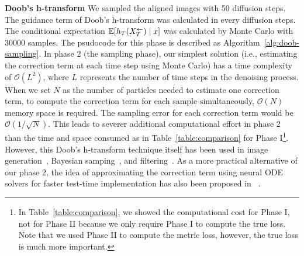 \textbf{Doob's h-transform}
We sampled the aligned images with 50 diffusion steps. The guidance term of Doob's h-transform was calculated in every diffusion steps. The conditional expectation $\mathbb{E}[h_T(X^\leftarrow_T) \mid x]$ was calculated by Monte Carlo with 30000 samples. The psudocode for this phase is described as Algorithm~\ref{alg:doob-sampling}.
\revisedStart
In phase 2 (the sampling phase), our simplest solution (i.e., estimating the correction term at each time step using Monte Carlo) has a time complexity of $\mathcal{O}(L^2)$, where $L$ represents the number of time steps in the denoising process. When we set $N$ as the number of particles needed to estimate one correction term, to compute the correction term for each sample simultaneously, $ \mathcal{O}(N)$ memory space is required. The sampling error for each correction term would be $\mathcal{O}(1/\sqrt{N})$. This leads to severer additional computational effort in phase 2 than the time and space consumed as in Table~\ref{table:comparison} for Phase I\footnote{In Table~\ref{table:comparison}, we showed the computational cost for Phase I, not for Phase II because we only require Phase I to compute the true loss. Note that we used Phase II to compute the metric loss, however, the true loss is much more important.}.
However, this Doob's h-transform technique itself has been used in image generation~\citep{uehara2024RLHF,uehara2024reward}, Bayesian samping~\citep{heng2024schrodingerbridge}, and filtering~\citep{chopin2023doob}. 
As a more practical alternative of our phase 2, the idea of approximating the correction term using neural ODE solvers for faster test-time implementation has also been proposed in ~\citep{uehara2024reward,uehara2024RLHF}.
\revisedEnd

